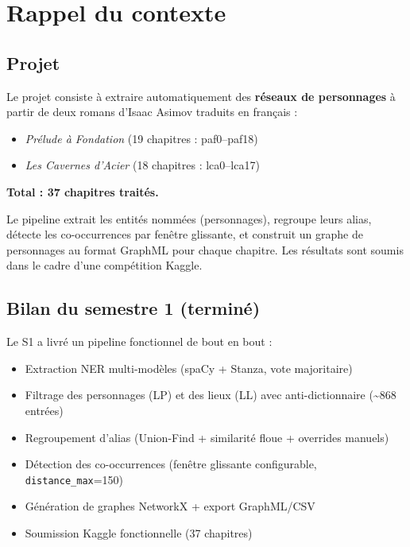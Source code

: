 \documentclass[a4paper,11pt]{article}
\begin{document}
\tableofcontents
\newpage

\section{Rappel du contexte}

\subsection{Projet}

Le projet consiste à extraire automatiquement des \textbf{réseaux de personnages} à partir de deux
romans d'Isaac Asimov traduits en français :

\begin{itemize}[noitemsep]
  \item \textit{Prélude à Fondation} (19 chapitres : paf0--paf18)
  \item \textit{Les Cavernes d'Acier} (18 chapitres : lca0--lca17)
\end{itemize}

\textbf{Total : 37 chapitres traités.}

Le pipeline extrait les entités nommées (personnages), regroupe leurs alias, détecte les co-occurrences
par fenêtre glissante, et construit un graphe de personnages au format GraphML pour chaque chapitre.
Les résultats sont soumis dans le cadre d'une compétition Kaggle.

\subsection{Bilan du semestre 1 (terminé)}

Le S1 a livré un pipeline fonctionnel de bout en bout :

\begin{itemize}[noitemsep]
  \item Extraction NER multi-modèles (spaCy + Stanza, vote majoritaire)
  \item Filtrage des personnages (LP) et des lieux (LL) avec anti-dictionnaire (\textasciitilde 868 entrées)
  \item Regroupement d'alias (Union-Find + similarité floue + overrides manuels)
  \item Détection des co-occurrences (fenêtre glissante configurable, \texttt{distance\_max}=150)
  \item Génération de graphes NetworkX + export GraphML/CSV
  \item Soumission Kaggle fonctionnelle (37 chapitres)
\end{itemize}
\end{document}
